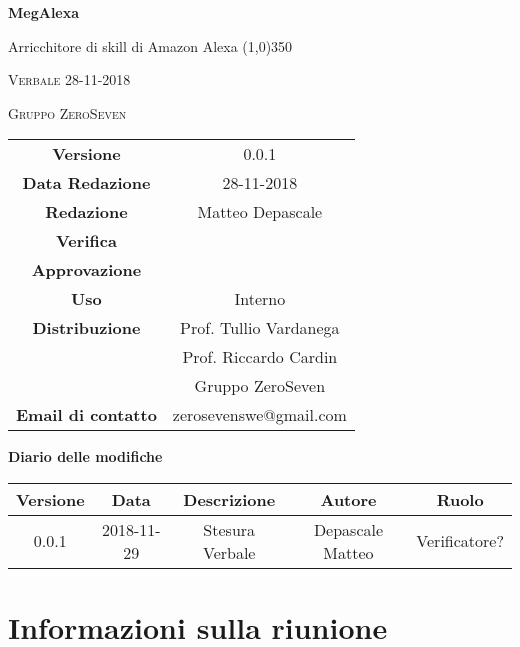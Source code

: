 \documentclass[a4paper,12pt]{article}
\author{Matteo Depascale}
\date{29-11-2018}
\begin{document}
\begin{titlepage}
	\centering
	{\huge\bfseries MegAlexa\par}
	Arricchitore di skill di Amazon Alexa
	\line(1,0){350} \\
	{\scshape\LARGE Verbale 28-11-2018 \par}
	\vspace{1cm}
	{\scshape Gruppo ZeroSeven \par}
	\logo
	\begin{tabular}{c|c}
		{\hfill \textbf{Versione}} 			& 0.0.1				\\
		{\hfill\textbf{Data Redazione}} 	& 28-11-2018		\\ 
		{\hfill\textbf{Redazione}} 			&  		Matteo Depascale			\\ 
		{\hfill\textbf{Verifica}} 				&  				\\ 
		{\hfill\textbf{Approvazione}} 		&  			\\ 
		{\hfill\textbf{Uso}} 					& 	Interno	\\ 
		{\hfill\textbf{Distribuzione}} 			& 			Prof. Tullio Vardanega \\ & Prof. Riccardo Cardin \\ & Gruppo ZeroSeven		\\ 
		{\hfill\textbf{Email di contatto}} & zerosevenswe@gmail.com \\
	\end{tabular}
\end{titlepage}
	

	
	\label{LastFrontPage}
	

	\newpage
	\cleardoublepage
	\begin{center}
		\textbf{Diario delle modifiche}
	\end{center}
	\begin{center}
		\begin{tabular}{|c|c|c|c|c|}
			\hline
			\textbf{Versione} & \textbf{Data} & \textbf{Descrizione} & \textbf{Autore} & \textbf{Ruolo} \\
			\hline
			0.0.1 & 2018-11-29 & Stesura Verbale & Depascale Matteo & Verificatore?\\
			\hline
		\end{tabular}
	\end{center}
	
	\cleardoublepage
	\pagestyle{mymain}
	
	\tableofcontents
	\cleardoublepage
	
	\section{Informazioni sulla riunione}
\end{document}
